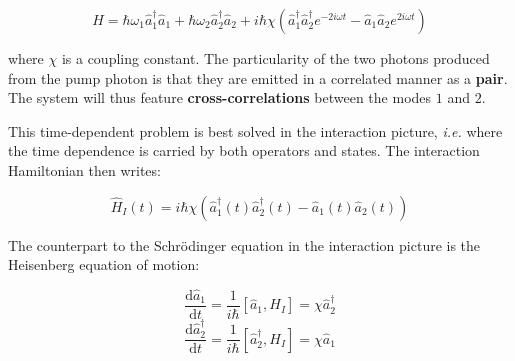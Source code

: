 \begin{equation}
    H=\hbar \omega_1 \hat{a}_1^{\dagger} \hat{a}_1+ \hbar \omega_2 \hat{a}_2^{\dagger} \hat{a}_2 + i \hbar \chi (\hat{a}_1^{\dagger}  \hat{a}_2^{\dagger} e^{-2i\omega t} - \hat{a}_1 \hat{a}_2 e^{2i\omega t})
\end{equation}

\noindent where $\chi$ is a coupling constant. The particularity of the two photons produced from the pump photon is that they are emitted in a correlated manner as a \textbf{pair}. The system will thus feature \textbf{cross-correlations} between the modes $1$ and $2$. 



This time-dependent problem is best solved in the interaction picture, {\it i.e.} where the time dependence is carried by both operators and states. The interaction Hamiltonian then writes:

\begin{equation}
    \hat{H}_I(t)=i \hbar \chi (\hat{a}_1^{\dagger}(t)  \hat{a}_2^{\dagger}(t) - \hat{a}_1(t) \hat{a}_2(t))
\end{equation}

\noindent The counterpart to the Schrödinger equation in the interaction picture is the Heisenberg equation of motion:

\begin{equation}
    \frac{\mathrm{d}\hat{a}_1}{\mathrm{d}t}= \frac{1}{i\hbar} [\hat{a}_1,H_I]=\chi \hat{a}_2^{\dagger}
\end{equation}
\begin{equation}
    \frac{\mathrm{d}\hat{a}_2^{\dagger}}{\mathrm{d}t}= \frac{1}{i\hbar} [\hat{a}_2^{\dagger},H_I]=\chi \hat{a}_1
\end{equation}

